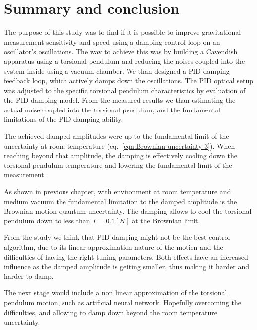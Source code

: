 \documentclass[\main/master.tex]{subfiles}
\begin{document}
\chapter{Summary and conclusion}\label{chapter:Summary and conclusion}
The purpose of this study was to find if it is possible to improve gravitational measurement sensitivity and speed using a damping control loop on an oscillator's oscillations. The way to achieve this was by building a Cavendish apparatus using a torsional pendulum and reducing the noises coupled into the system inside using a vacuum chamber. We than designed a PID damping feedback loop, which actively damps down the oscillations. The PID optical setup was adjusted to the specific torsional pendulum characteristics by evaluation of the PID damping model. From the measured results we than estimating the actual noise coupled into the torsional pendulum, and the fundamental limitations of the PID damping ability.
\par\noindent
The achieved damped amplitudes were up to the fundamental limit of the uncertainty at room temperature (eq.~\ref{eqn:Brownian uncertainty 3}). When reaching beyond that amplitude, the damping is effectively cooling down the torsional pendulum temperature and lowering the fundamental limit of the measurement. 
\par\noindent
As shown in previous chapter, with environment at room temperature and medium vacuum the fundamental limitation to the damped amplitude is the Brownian motion quantum uncertainty. The damping allows to cool the torsional pendulum down to less than $T=0.1[K]$ at the Brownian limit.
\par\noindent
From the study we think that PID damping might not be the best control algorithm, due to its linear approximation nature of the motion and the difficulties of having the right tuning parameters. Both effects have an increased influence as the damped amplitude is getting smaller, thus making it harder and harder to damp.
\par\noindent
The next stage would include a non linear approximation of the torsional pendulum motion, such as artificial neural network. Hopefully overcoming the difficulties, and allowing to damp down beyond the room temperature uncertainty. 
\end{document}
